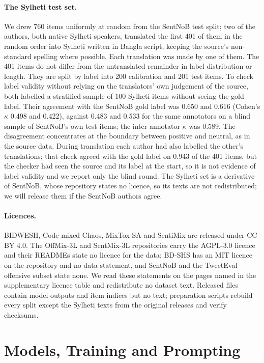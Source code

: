 \paragraph{The Sylheti test set.}
We drew 760 items uniformly at random from the SentNoB test split; two of the authors, both native Sylheti speakers,
translated the first 401 of them in the random order into Sylheti written in Bangla script, keeping the source's
non-standard spelling where possible. Each translation was made by one of them. The 401 items do not differ from the
untranslated remainder in label distribution or length. They are split by label into 200 calibration and 201 test items.
To check label validity without relying on the translators' own judgement of the source, both labelled a
stratified sample of 100 Sylheti items without seeing the gold label. Their agreement with the SentNoB gold label was
0.650 and 0.616 (Cohen's $\kappa$ 0.498 and 0.422), against 0.483 and 0.533 for the same annotators on a blind sample of
SentNoB's own test items; the inter-annotator $\kappa$ was 0.589. The disagreement concentrates at the boundary between
positive and neutral, as in the source data. During translation each author had also labelled the other's
translations; that check agreed with the gold label on 0.943 of the 401 items, but the checker had seen the source and
its label at the start, so it is not evidence of label validity and we report only the blind round. The Sylheti set is a derivative of SentNoB, whose repository states no
licence, so its texts are not redistributed; we will release them if the SentNoB authors agree.

\paragraph{Licences.}
BIDWESH, Code-mixed Chaos, MixTox-SA and SentiMix are released under CC BY 4.0. The OffMix-3L and SentMix-3L repositories
carry the AGPL-3.0 licence and their READMEs state no licence for the data; BD-SHS has an MIT licence on the repository
and no data statement, and SentNoB and the TweetEval offensive subset state none. We read these statements on the pages
named in the supplementary licence table and redistribute no dataset text. Released files contain model
outputs and item indices but no text; preparation scripts rebuild every split except the Sylheti texts from the original
releases and verify checksums.

\section{Models, Training and Prompting}
\label{sec:appendix-training}

